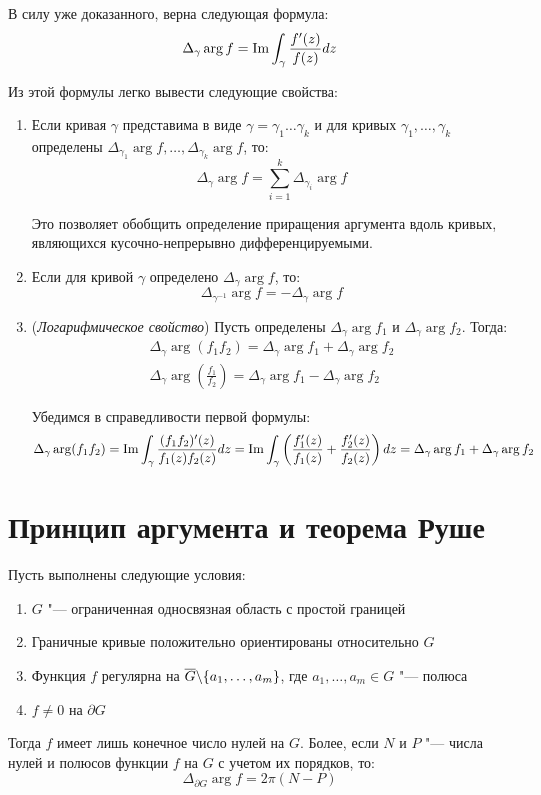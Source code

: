 \begin{note}
	В силу уже доказанного, верна следующая формула:
	\[\Delta_\gamma\arg{f} = \operatorname{Im}\int_\gamma \frac{f'(z)}{f(z)}dz\]
	
	Из этой формулы легко вывести следующие свойства:
	\begin{enumerate}
		\item Если кривая $\gamma$ представима в виде $\gamma = \gamma_1\dotsc \gamma_k$ и для кривых $\gamma_1, \dotsc, \gamma_k$ определены $\Delta_{\gamma_1}\arg f, \dotsc, \Delta_{\gamma_k}\arg f$, то:
		\[\Delta_{\gamma}\arg f = \sum_{i = 1}^k\Delta_{\gamma_i}\arg f\]
		
		Это позволяет обобщить определение приращения аргумента вдоль кривых, являющихся кусочно-непрерывно дифференцируемыми.
		
		\item Если для кривой $\gamma$ определено $\Delta_{\gamma}\arg f$, то:
		\[\Delta_{\gamma^{-1}}\arg f = -\Delta_{\gamma}\arg f\]
		
		\item (\textit{Логарифмическое свойство}) Пусть определены $\Delta_{\gamma}\arg f_1$ и $\Delta_{\gamma}\arg f_2$. Тогда:
		\begin{gather*}
			\Delta_{\gamma}\arg (f_1f_2) = \Delta_{\gamma}\arg f_1 + \Delta_{\gamma}\arg f_2
			\\
			\Delta_{\gamma}\arg \left(\frac{f_1}{f_2}\right) = \Delta_{\gamma}\arg f_1 - \Delta_{\gamma}\arg f_2
		\end{gather*}
	
		Убедимся в справедливости первой формулы:
		\[\Delta_{\gamma}\arg (f_1f_2) =  \operatorname{Im}\int_\gamma \frac{(f_1f_2)'(z)}{f_1(z)f_2(z)}dz = \operatorname{Im}\int_\gamma \left(\frac{f_1'(z)}{f_1(z)} + \frac{f_2'(z)}{f_2(z)}\right)dz = \Delta_{\gamma}\arg f_1 + \Delta_{\gamma}\arg f_2\]
	\end{enumerate}
\end{note}

\section{Принцип аргумента и теорема Руше}

\begin{theorem}
	Пусть выполнены следующие условия:
	\begin{enumerate}
		\item $G$ "--- ограниченная односвязная область с простой границей
		
		\item Граничные кривые положительно ориентированы относительно $G$
		
		\item Функция $f$ регулярна на $\overline{G} \backslash \{a_1, \dotsc, a_m\}$, где $a_1, \dotsc, a_m \in G$ "--- полюса
		
		\item $f \ne 0$ на $\partial G$
	\end{enumerate}
	
	Тогда $f$ имеет лишь конечное число нулей на $G$. Более, если $N$ и $P$ "--- числа нулей и полюсов функции $f$ на $G$ с учетом их порядков, то:
	\[\Delta_{\partial G} \arg f = 2\pi (N - P)\]
\end{theorem}

